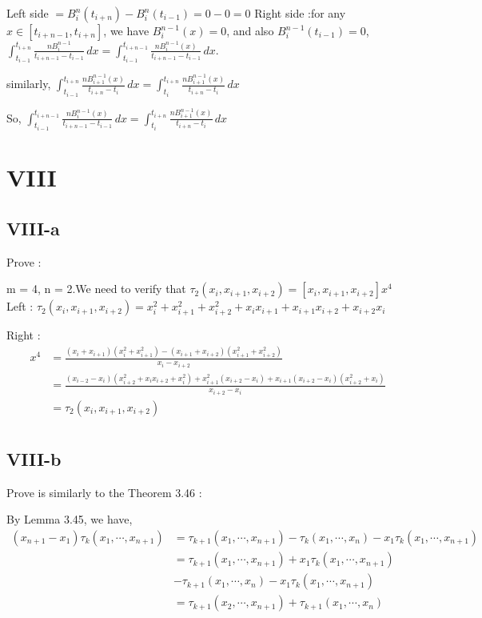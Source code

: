 \documentclass[a4paper]{article}
\begin{document}
Left side $= B_{i}^{n}(t_{i+n}) - B_{i}^{n}(t_{i-1}) = 0 - 0 = 0$
Right side :for any $x \in [t_{i+n-1}, t_{i+n}]$, we have $B_{i}^{n-1}(x) = 0$, and also $B_{i}^{n-1}(t_{i-1}) = 0$,
$\int_{t_{i-1}}^{t_{i+n}} \frac{nB_{i}^{n-1}}{t_{i+n-1} - t_{i-1}} \,dx 
= \int_{t_{i-1}}^{t_{i+n-1}} \frac{nB_{i}^{n-1}(x)}{t_{i+n-1} - t_{i-1}} \,dx $.

similarly, 
$\int_{t_{i-1}}^{t_{i+n}} \frac{nB_{i+1}^{n-1}(x)}{t_{i+n}-t_{i}} \,dx 
= \int_{t_{i}}^{t_{i+n}} \frac{nB_{i+1}^{n-1}(x)}{t_{i+n} - t_{i}} \,dx $

So, $\int_{t_{i-1}}^{t_{i+n-1}} \frac{nB_{i}^{n-1}(x)}{t_{i+n-1} - t_{i-1}} \,dx 
= \int_{t_{i}}^{t_{i+n}} \frac{nB_{i+1}^{n-1}(x)}{t_{i+n} - t_{i}} \,dx $

\section*{VIII}

\subsection*{VIII-a}
Prove :

m = 4, n = 2.We need to verify that $\tau_{2}(x_{i}, x_{i+1}, x_{i+2}) = [x_{i}, x_{i+1}, x_{i+2}]x^{4}$
Left : $\tau_{2}(x_{i}, x_{i+1}, x_{i+2}) = x_{i}^{2} + x_{i+1}^{2} + x_{i+2}^{2} + x_{i}x_{i+1} + x_{i+1}x_{i+2} + x_{i+2}x_{i}$

Right : \begin{align}
    [x_{i}, x_{i+1}, x_{i+2}]x^{4} &= \frac{(x_{i} + x_{i+1})(x_{i}^{2} + x_{i+1}^{2})
        - (x_{i+1} + x_{i+2})(x_{i+1}^{2} + x_{i+2}^{2})}{x_{i} - x_{i+2}} \\
    &= \frac{(x_{i-2} - x_{i})(x_{i+2}^{2} + x_{i}x_{i+2} + x_{i}^{2}) + x_{i+1}^{2}(x_{i+2} - x_{i})
        + x_{i+1}(x_{i+2} - x_{i})(x_{i+2}^{2} + x_{i})}{x_{i+2} - x_{i}} \\
    &= \tau_{2}(x_{i}, x_{i+1}, x_{i+2})\\
    \end{align}


\subsection*{VIII-b}
Prove is similarly to the Theorem 3.46 :

By Lemma 3.45, we have,
\begin{align}
    (x_{n+1} - x_{1})\tau_{k}(x_{1},\cdots,x_{n+1}) 
    &= \tau_{k+1}(x_{1},\cdots,x_{n+1}) - \tau_{k}(x_{1},\cdots,x_{n}) - x_{1}\tau_{k}(x_{1},\cdots,x_{n+1})\\
    &= \tau_{k+1}(x_{1},\cdots,x_{n+1}) + x_{1}\tau_{k}(x_{1},\cdots,x_{n+1}) \\
    &- \tau_{k+1}(x_{1},\cdots,x_{n}) - x_{1}\tau_{k}(x_{1},\cdots,x_{n+1}) \\
    &= \tau_{k+1}(x_{2},\cdots,x_{n+1}) + \tau_{k+1}(x_{1},\cdots,x_{n}) \\
\end{align}
\end{document}

